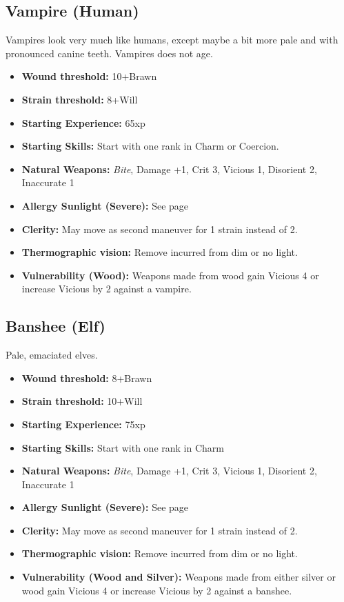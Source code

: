 \documentclass{book}
\begin{document}
\begin{multicols}{2}
	\subsection{Vampire (Human)}
	Vampires look very much like humans, except maybe a bit more pale and with pronounced canine teeth. Vampires does not age.
	
	\begin{itemize}
		\item \textbf{Wound threshold:} 10+Brawn
		\item \textbf{Strain threshold:} 8+Will
		\item \textbf{Starting Experience:} 65xp
		\item \textbf{Starting Skills:} Start with one rank in Charm or Coercion.
		\item \textbf{Natural Weapons:} \textit{Bite}, Damage +1, Crit 3, Vicious 1, Disorient 2,  Inaccurate 1
		\item \textbf{Allergy Sunlight (Severe):} See page \pageref{allergysunlight} 
		\item \textbf{Clerity:} May move as second maneuver for 1 strain instead of 2.	
		\item \textbf{Thermographic vision:} Remove \SetbackDie \SetbackDie incurred from dim or no light.
		\item \textbf{Vulnerability (Wood):} Weapons made from wood gain Vicious 4 or increase Vicious by 2 against a vampire.
	
	\end{itemize}
	
	\subsection{Banshee (Elf)}
	Pale, emaciated elves.
	
	\begin{itemize}
		\item \textbf{Wound threshold:} 8+Brawn
		\item \textbf{Strain threshold:} 10+Will
		\item \textbf{Starting Experience:} 75xp
		\item \textbf{Starting Skills:} Start with one rank in Charm
		\item \textbf{Natural Weapons:} \textit{Bite}, Damage +1, Crit 3, Vicious 1, Disorient 2,  Inaccurate 1
		\item \textbf{Allergy Sunlight (Severe):} See page \pageref{allergysunlight} 
		\item \textbf{Clerity:} May move as second maneuver for 1 strain instead of 2.	
		\item \textbf{Thermographic vision:} Remove \SetbackDie \SetbackDie incurred from dim or no light.
		\item \textbf{Vulnerability (Wood and Silver):} Weapons made from either silver or wood gain Vicious 4 or increase Vicious by 2 against a banshee.
	\end{itemize}
	


\end{multicols}
\end{document}
